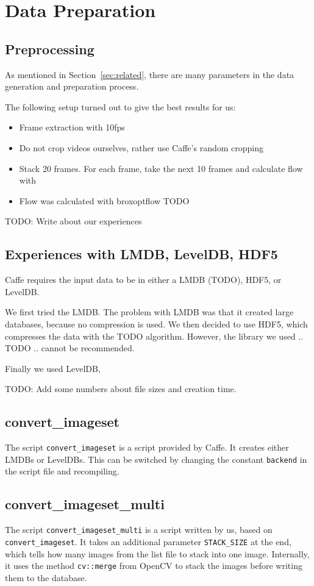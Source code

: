 \section{Data Preparation}
\label{sec:data}

\subsection{Preprocessing}

As mentioned in Section~\ref{sec:related}, there are many parameters in the data generation and preparation process.

The following setup turned out to give the best results for us:
\begin{itemize}
	\item Frame extraction with 10fps
	\item Do not crop videos ourselves, rather use Caffe's random cropping
	\item Stack 20 frames. For each frame, take the next 10 frames and calculate flow with
	\item Flow was calculated with broxoptflow TODO
\end{itemize}

TODO: Write about our experiences

\subsection{Experiences with LMDB, LevelDB, HDF5}
Caffe requires the input data to be in either a LMDB (TODO), HDF5, or LevelDB.

We first tried the LMDB.
The problem with LMDB was that it created large databases, because no compression is used.
We then decided to use HDF5, which compresses the data with the TODO algorithm.
However, the library we used .. TODO .. cannot be recommended.

Finally we used LevelDB,

TODO: Add some numbers about file sizes and creation time.
\subsection{convert\_imageset}
The script \texttt{convert\_imageset} is a script provided by Caffe.
It creates either LMDBs or LevelDBs.
This can be switched by changing the constant \texttt{backend} in the script file and recompiling.
\subsection{convert\_imageset\_multi}
The script \texttt{convert\_imageset\_multi} is a script written by us, based on \texttt{convert\_imageset}.
It takes an additional parameter \texttt{STACK\_SIZE} at the end, which tells how many images from the list file to stack into one image.
Internally, it uses the method \texttt{cv::merge} from OpenCV to stack the images before writing them to the database.
